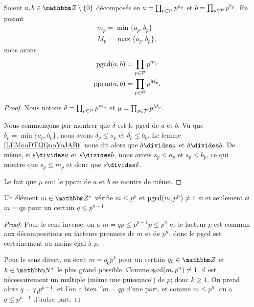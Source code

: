 \begin{proposition}     \label{PROPooNQBOooHWqTvs}
    Soient \( a,b\in \eZ\setminus\{ 0 \}\) décomposés en \( a=\prod_{p\in\mathcal{P}}p^{a_p}\) et \( b=\prod_{p\in\mathcal{P}}p^{b_p}\). En posant 
    \begin{subequations}
        \begin{align}
            m_p=\min\{ a_p,b_p \}\\
            M_p=\max\{ a_p,b_p \},
        \end{align}
    \end{subequations}
    nous avons
    \begin{subequations}
        \begin{align}
            \operatorname{pgcd}(a,b)&=\prod_{p\in\mathcal{P}}p^{m_p}\\
            \operatorname{ppcm}(a,b)&=\prod_{p\in\mathcal{P}}p^{M_p}.
        \end{align}
    \end{subequations}
\end{proposition}

\begin{proof}
    Nous notons $\delta=\prod_{p\in\mathcal{P}}p^{m_p}$ et $\mu=\prod_{p\in\mathcal{P}}p^{M_p}$. 
    
    Nous commençons par montrer que \( \delta\) est le pgcd de \( a\) et \( b\). Vu que \( \delta_p=\min\{ a_p,b_p \}\), nous avons \( \delta_p\leq a_p\) et \( \delta_p\leq b_p\). Le lemme \ref{LEMooDTQQooYoJABt} nous dit alors que \( \delta\divides a\) et \( \delta\divides b\). De même, si \(s\divides a\) et \( s\divides b\), nous avons \( s_p\leq a_p\) et \( s_p\leq b_p\), ce qui montre que \( s_p\leq m_p\) et donc que \( s\divides \delta\).

    Le fait que \( \mu\) soit le ppcm de \( a\) et \( b\) se montre de même.
\end{proof}

\begin{corollary}  \label{CORooQIMHooUzLUJY}
    Un élément \( m\in \eZ^*\) vérifie \( m\leq p^n\) et \( \operatorname{pgcd}(m,p^n)\neq 1\) si et seulement si \( m=qp\) pour un certain \( q\leq p^{n-1}\).
\end{corollary}

\begin{proof}
Pour le sens inverse: on a \( m = qp \leq p^{n-1}p \leq p^n \) et le facteur \( p \) est commun aux décompositions en facteurs premiers de \( m \) et de \( p^n \), donc le pgcd est certainement au moins égal à \( p \).

Pour le sens direct, on écrit \( m = q_0 p^k \) pour un certain \( q_0 \in \eZ \) et \( k \in \eN^* \) le plus grand possible. Comme\( \operatorname{pgcd}(m,p^n)\neq 1\), il est nécessairement un multiple (même une puissance!) de \( p \); donc \( k \geq 1 \). On prend alors \( q = q_0 p^{k-1} \), et l'on a bien ˇ\( m = qp \) d'une part, et comme \( m\leq p^n\), on a \( q\leq p^{n-1}\) d'autre part.
\end{proof}

